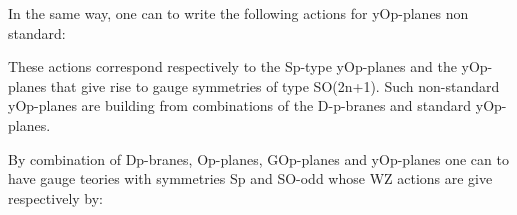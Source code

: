 \documentclass[a4paper,a4paper]{article}
\begin{document}
\begin{center}
{  \coordHE{} }
\end{center}
In the same way, one can to write the following actions for yOp-planes non standard:
\begin{center}
{  \coordHE{} }
\end{center}
\begin{center}
{  \coordHE{} }
\end{center}
These actions correspond respectively to the Sp-type yOp-planes and the yOp-planes that give rise to gauge symmetries of type SO(2n+1).  Such non-standard yOp-planes are building from combinations of the D-p-branes and standard yOp-planes.



By combination of Dp-branes, Op-planes, GOp-planes  and yOp-planes one can to have gauge teories with symmetries Sp and SO-odd whose WZ actions are give respectively by:
\begin{center}
{  \coordHE{} }
\end{center}
\begin{center}
{  \coordHE{} }
\end{center}
\end{document}
